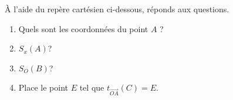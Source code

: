 %
%
    À l'aide du repère cartésien ci-dessous, réponds aux questions.
    \begin{center}
        
    \end{center}
    \begin{enumerate}
        \item Quels sont les coordonnées du point $A$ ? 
        \item $S_x(A)$?
        \item $S_O(B)$?
        \item Place le point $E$ tel que $t_{\overrightarrow{OA}}(C)=E$.
    \end{enumerate}

